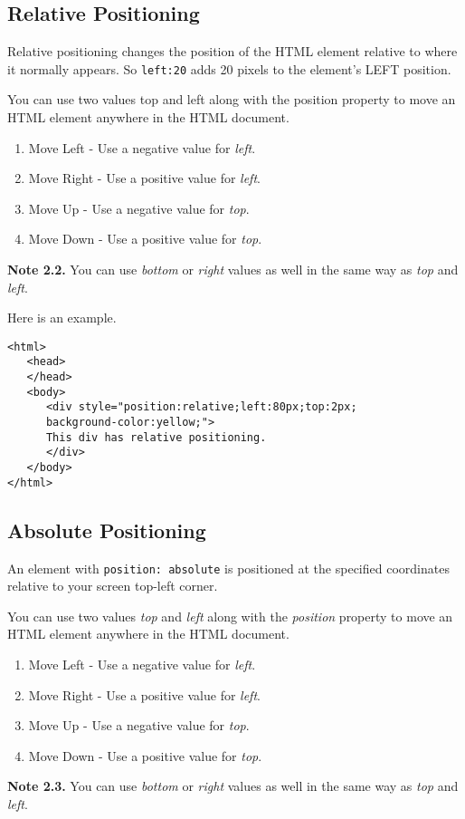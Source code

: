 \documentclass[a4paper,oneside]{book}
\numberwithin{equation}{chapter}
\begin{document}
\subsection{Relative Positioning}
Relative positioning changes the position of the HTML element relative to where it normally appears. So \verb|left:20| adds 20 pixels to the element's LEFT position.

You can use two values top and left along with the position property to move an HTML element anywhere in the HTML document.
\begin{enumerate}
\item Move Left - Use a negative value for \textit{left}.
\item Move Right - Use a positive value for \textit{left}.
\item Move Up - Use a negative value for \textit{top}.
\item Move Down - Use a positive value for \textit{top}.
\end{enumerate}
\textbf{Note 2.2.} You can use \textit{bottom} or \textit{right} values as well in the same way as \textit{top} and \textit{left}.

Here is an example.
\begin{verbatim}
<html>
   <head>
   </head>
   <body>
      <div style="position:relative;left:80px;top:2px;
      background-color:yellow;">
      This div has relative positioning.
      </div>
   </body>
</html>
\end{verbatim}
\subsection{Absolute Positioning}
An element with \verb|position: absolute| is positioned at the specified coordinates relative to your screen top-left corner.

You can use two values \textit{top} and \textit{left} along with the \textit{position} property to move an HTML element anywhere in the HTML document.
\begin{enumerate}
\item Move Left - Use a negative value for \textit{left}.
\item Move Right - Use a positive value for \textit{left}.
\item Move Up - Use a negative value for \textit{top}.
\item Move Down - Use a positive value for \textit{top}.
\end{enumerate}
\textbf{Note 2.3.} You can use \textit{bottom} or \textit{right} values as well in the same way as \textit{top} and \textit{left}.
\end{document}
